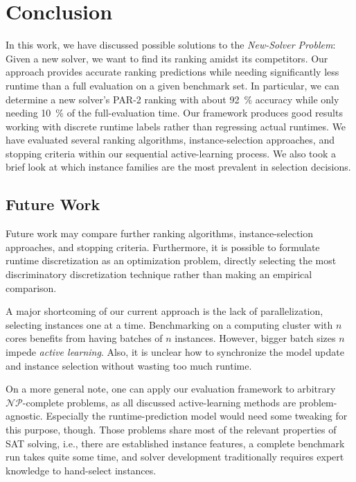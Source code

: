 \documentclass[runningheads]{llncs}
\begin{document}
\section{Conclusion}

In this work, we have discussed possible solutions to the \emph{New-Solver Problem}:
Given a new solver, we want to find its ranking amidst its competitors.
Our approach provides accurate ranking predictions while needing significantly less runtime than a full evaluation on a given benchmark set.
In particular, we can determine a new solver's PAR-2 ranking with about \SI{92}{\%} accuracy while only needing \SI{10}{\%} of the full-evaluation time.
Our framework produces good results working with discrete runtime labels rather than regressing actual runtimes.
We have evaluated several ranking algorithms, instance-selection approaches, and stopping criteria within our sequential active-learning process.
We also took a brief look at which instance families are the most prevalent in selection decisions.

\subsection{Future Work}

Future work may compare further ranking algorithms, instance-selection approaches, and stopping criteria.
Furthermore, it is possible to formulate runtime discretization as an optimization problem, directly selecting the most discriminatory discretization technique rather than making an empirical comparison.

A major shortcoming of our current approach is the lack of parallelization, selecting instances one at a time.
Benchmarking on a computing cluster with $n$ cores benefits from having batches of $n$ instances.
However, bigger batch sizes $n$ impede \emph{active learning}.
Also, it is unclear how to synchronize the model update and instance selection without wasting too much runtime.

On a more general note, one can apply our evaluation framework to arbitrary $\mathcal{NP}$-complete problems, as all discussed active-learning methods are problem-agnostic.
Especially the runtime-prediction model would need some tweaking for this purpose, though.
Those problems share most of the relevant properties of SAT solving, i.e., there are established instance features, a complete benchmark run takes quite some time, and solver development traditionally requires expert knowledge to hand-select instances.


%
%


\end{document}
